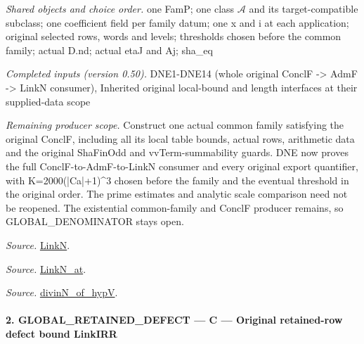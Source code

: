 \emph{Shared objects and choice order.} one FamP; one class $\mathcal A$ and its target-compatible subclass; one coefficient field per family datum; one x and i at each application; original selected rows, words and levels; thresholds chosen before the common family; actual D.nd; actual etaJ and Aj; sha\_\allowbreak eq

\emph{Completed inputs (version 0.50).} DNE1-DNE14 (whole original ConclF -> AdmF -> LinkN consumer), Inherited original local-bound and length interfaces at their supplied-data scope

\emph{Remaining producer scope.} Construct one actual common family satisfying the original ConclF, including all its local table bounds, actual rows, arithmetic data and the original ShaFinOdd and vvTerm-summability guards. DNE now proves the full ConclF-to-AdmF-to-LinkN consumer and every original export quantifier, with K=2000(|Ca|+1)\textasciicircum{}3 chosen before the family and the eventual threshold in the original order. The prime estimates and analytic scale comparison need not be reopened. The existential common-family and ConclF producer remains, so GLOBAL\_\allowbreak DENOMINATOR stays open.

\emph{Source.} \href{https://github.com/CocoSgt/riemann-hypothesis-lean/blob/7cbf7a0c32fca1badf05931879a37c3f8a2b03b4/src/Formalism/SharpRestriction/GlobalTheoremInputs.lean#L45-L48}{LinkN}.

\emph{Source.} \href{https://github.com/CocoSgt/riemann-hypothesis-lean/blob/7cbf7a0c32fca1badf05931879a37c3f8a2b03b4/src/Formalism/SharpRestriction/GlobalTheoremInputs.lean#L40-L44}{LinkN\_\allowbreak at}.

\emph{Source.} \href{https://github.com/CocoSgt/riemann-hypothesis-lean/blob/7cbf7a0c32fca1badf05931879a37c3f8a2b03b4/src/Development/AutomorphicArithmetic/CharacterBoxes/DivinNOfHypV.lean#L117-L134}{divinN\_\allowbreak of\_\allowbreak hypV}.



\paragraph{2. GLOBAL\_\allowbreak RETAINED\_\allowbreak DEFECT — C — Original retained-row defect bound LinkIRR}


